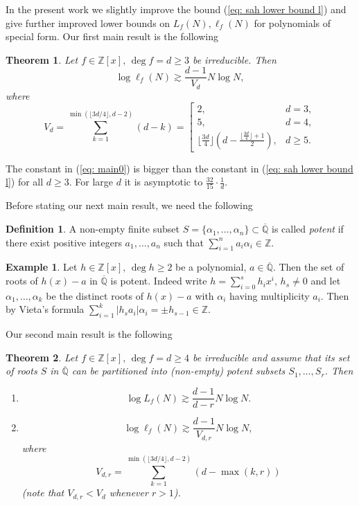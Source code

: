 \documentclass[alphabetic]{amsart}
\newtheorem{thm}{Theorem}
\theoremstyle{definition}
\newtheorem{defi}[claim]{Definition}
\newtheorem{ex}[claim]{Example}
\numberwithin{equation}{section}
\newcommand{\Z}{{\mathbb Z}}
\newcommand{\Q}{{\mathbb Q}}
\newcommand{\Qb}{{\overline{\Q}}}
\numberwithin{equation}{section}
\begin{document}
In the present work we slightly improve the bound (\ref{eq: sah lower bound l}) and give further improved lower bounds on $L_f(N),\ell_f(N)$ for polynomials of special form. Our first main result is the following

\begin{thm}\label{thm: main0} Let $f\in\Z[x],\,\deg f=d\ge 3$ be irreducible. Then
\begin{equation}\label{eq: main0}\log\ell_f(N)\gtrsim \frac{d-1}{V_d}N\log N,\end{equation}
where
\begin{equation}\label{eq: Vd}V_d=\sum_{k=1}^{\min(\lfloor 3d/4\rfloor,d-2)}(d-k)=\left[\begin{array}{ll}2,& d=3,\\
5,&d=4,\\
{ \lfloor\frac{3d}4\rfloor\left(d-\frac{\lfloor\frac{3d}4\rfloor+1}2\right)},&d\ge 5.\end{array}\right.\end{equation}
\end{thm}

The constant in (\ref{eq: main0}) is bigger than the constant in (\ref{eq: sah lower bound l}) for all $d\ge 3$. For large $d$ it is asymptotic to $\frac{32}{15}\cdot\frac 1d$. 

Before stating our next main result, we need the following

\begin{defi}
    A non-empty finite subset $S=\{\alpha_1,\ldots,\alpha_n\}\subset\overline\Q$ is called \emph{potent} if there exist positive integers $a_1,\ldots,a_n$ such that $\sum_{i=1}^na_i\alpha_i\in\Z$.
\end{defi}

\begin{ex}\label{ex: potent}
    Let $h\in\Z[x],\,\deg h\ge 2$ be a polynomial, $a\in\overline\Q$. Then the set of roots of $h(x)-a$ in $\Qb$ is potent.
    Indeed write $h=\sum_{i=0}^sh_ix^i,\,h_s\neq 0$ and let $\alpha_1,\ldots,\alpha_k$ be the distinct roots of $h(x)-a$ with $\alpha_i$ having multiplicity $a_i$. Then by Vieta's formula $\sum_{i=1}^k|h_sa_i|\alpha_i=\pm h_{s-1}\in\Z$.
\end{ex}

Our second main result is the following

\begin{thm}\label{thm: main1} Let $f\in\Z[x],\,\deg f=d\ge 4$ be irreducible and assume that its set of roots $S$ in $\overline\Q$ can be partitioned into (non-empty) potent subsets $S_1,\ldots,S_r$. Then
\begin{enumerate}\item[(i)]
$$\log L_f(N)\gtrsim \frac{d-1}{d-r}N\log N.$$
\item[(ii)]
$$\log\ell_f(N)\gtrsim\frac{d-1}{V_{d,r}}N\log N,$$ where
\begin{equation}\label{eq: Vdr}V_{d,r}=\sum_{k=1}^{\min(\lfloor 3d/4\rfloor,d-2)}(d-\max(k,r))\end{equation}
(note that $V_{d,r}<V_d$ whenever $r>1$).\end{enumerate}\end{thm}
\end{document}

